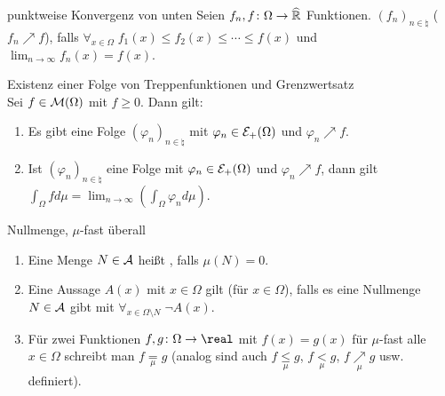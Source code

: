 \linie

\begin{Def}{punktweise Konvergenz von unten}
    Seien $f_n, f\colon \Omega \rightarrow \widehat{\mathbb{R}}$ Funktionen.
    $(f_n)_{n \in \natural}$ 
    ($f_n \nearrow f$), falls $\forall_{x \in \Omega}\; f_1(x) \le f_2(x) \le \dotsb \le f(x)$
    und\\
    $\lim_{n \to \infty} f_n(x) = f(x)$.
\end{Def}

\begin{Satz}{Existenz einer Folge von Treppenfunktionen und Grenzwertsatz}\\
    Sei $f \in \mathcal{M}(\Omega)$ mit $f \ge 0$.
    Dann gilt:
    \begin{enumerate}
        \item
        Es gibt eine Folge $(\varphi_n)_{n \in \natural}$ mit $\varphi_n \in \mathcal{E}_+(\Omega)$ und
        $\varphi_n \nearrow f$.

        \item
        Ist $(\varphi_n)_{n \in \natural}$ eine Folge mit $\varphi_n \in \mathcal{E}_+(\Omega)$ und
        $\varphi_n \nearrow f$, dann gilt\\
        $\int_\Omega f d\mu = \lim_{n \to \infty} \left(\int_\Omega \varphi_n d\mu\right)$.
    \end{enumerate}
\end{Satz}

\linie

\begin{Def}{Nullmenge, $\mu$-fast überall}
    \begin{enumerate}
        \item
        Eine Menge $N \in \mathcal{A}$ heißt , falls $\mu(N) = 0$.

        \item
        Eine Aussage $A(x)$ mit $x \in \Omega$ gilt 
        (für  $x \in \Omega$), falls es eine Nullmenge $N \in \mathcal{A}$ gibt
        mit $\forall_{x \in \Omega \setminus N}\; \lnot A(x)$.

        \item
        Für zwei Funktionen $f, g\colon \Omega \rightarrow \real$ mit
        $f(x) = g(x)$ für $\mu$-fast alle $x \in \Omega$ schreibt man
        $f \underset{\mu}{=} g$
        (analog sind auch $f \underset{\mu}{\le} g$, $f \underset{\mu}{<} g$,
        $f \underset{\mu}{\nearrow} g$ usw. definiert).
    \end{enumerate}
\end{Def}

